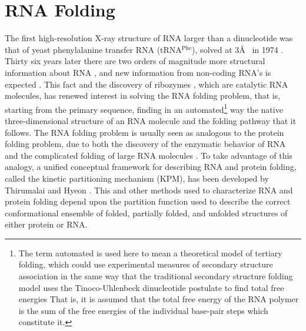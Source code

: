 \section{RNA Folding}
The first  high-resolution X-ray structure  of RNA larger
than  a dinucleotide  was  that of  yeast  phenylalanine transfer  RNA
(tRNA$^{\textrm{Phe}}$), solved at 3{\AA} ~in 1974 \cite{robertus1974,
  kim1974, stout1976}.  Thirty six years later there are two orders of
magnitude more structural information about RNA \cite{noller2005}, and
new information from non-coding RNA's is expected \cite{weinberg2009}.
This   fact   and  the   discovery   of  ribozymes   \cite{kruger1982,
  takada1983}, which are catalytic RNA molecules, has renewed interest
in  solving  the  RNA  folding  problem,  that  is,
starting    from    the    primary    sequence,    finding    in    an
automated\footnote{The  term   automated  is  used  here   to  mean  a
  theoretical model of tertiary  folding, which could use experimental
  measures of secondary structure association in the same way that the
  traditional  secondary   structure  folding  model  \cite{zuker1989,
    hofacker1994}  uses  the  Tinoco-Uhlenbeck dinucleotide  postulate
  \cite{borer1974} to find total free  energies That is, it is assumed
  that the total free energy of the RNA polymer is the sum of the free
  energies of the individual base-pair steps which constitute it.} way
the  native three-dimensional  structure of  an RNA  molecule  and the
folding pathway  that it follows.  The  RNA folding
problem is usually  seen as analogous to the  protein folding problem,
due  to  both   the  discovery  of  the  enzymatic   behavior  of  RNA
\cite{kruger1982, takada1983} and the complicated folding of large RNA
molecules  \cite{batey1999}.  To  take  advantage of  this analogy,  a
unified conceptual  framework for describing RNA  and protein folding,
called the kinetic partitioning mechanism (KPM), has been developed by
Thirumalai  and Hyeon  \cite{thirumalai2005}. This  and  other methods
used to characterize RNA and protein folding depend upon the partition
function  used  to describe  the  correct  conformational ensemble  of
folded,  partially  folded,  and unfolded  structures  \cite{chen1995,
  chen1998, thirumalai1996} of either protein or RNA.

